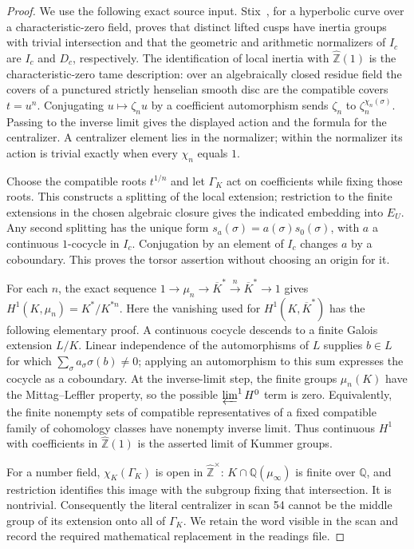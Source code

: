 \documentclass[11pt,a4paper]{article}
\newcommand{\Q}{\mathbb Q}
\newcommand{\Zhat}{\widehat{\mathbb Z}}
\begin{document}
\begin{proof}
We use the following exact source input. Stix~\cite[Proposition 11 and Corollary 12]{Stix2008}, for a hyperbolic curve over a characteristic-zero field, proves that distinct lifted cusps have inertia groups with trivial intersection and that the geometric and arithmetic normalizers of $I_c$ are $I_c$ and $D_c$, respectively. The identification of local inertia with $\Zhat(1)$ is the characteristic-zero tame description: over an algebraically closed residue field the covers of a punctured strictly henselian smooth disc are the compatible covers $t=u^n$. Conjugating $u\mapsto\zeta_nu$ by a coefficient automorphism sends $\zeta_n$ to $\zeta_n^{\chi_n(\sigma)}$. Passing to the inverse limit gives the displayed action and the formula for the centralizer. A centralizer element lies in the normalizer; within the normalizer its action is trivial exactly when every $\chi_n$ equals $1$.

Choose the compatible roots $t^{1/n}$ and let $\Gamma_K$ act on coefficients while fixing those roots. This constructs a splitting of the local extension; restriction to the finite extensions in the chosen algebraic closure gives the indicated embedding into $E_U$. Any second splitting has the unique form $s_a(\sigma)=a(\sigma)s_0(\sigma)$, with $a$ a continuous $1$-cocycle in $I_c$. Conjugation by an element of $I_c$ changes $a$ by a coboundary. This proves the torsor assertion without choosing an origin for it.

For each $n$, the exact sequence $1\to\mu_n\to\overline K^*\xrightarrow{n}\overline K^*\to1$ gives $H^1(K,\mu_n)=K^*/K^{*n}$. Here the vanishing used for $H^1(K,\overline K^*)$ has the following elementary proof. A continuous cocycle descends to a finite Galois extension $L/K$. Linear independence of the automorphisms of $L$ supplies $b\in L$ for which $\sum_\sigma a_\sigma\sigma(b)\ne0$; applying an automorphism to this sum expresses the cocycle as a coboundary. At the inverse-limit step, the finite groups $\mu_n(K)$ have the Mittag--Leffler property, so the possible $\varprojlim^1 H^0$ term is zero. Equivalently, the finite nonempty sets of compatible representatives of a fixed compatible family of cohomology classes have nonempty inverse limit. Thus continuous $H^1$ with coefficients in $\Zhat(1)$ is the asserted limit of Kummer groups.

For a number field, $\chi_K(\Gamma_K)$ is open in $\Zhat^\times$: $K\cap\Q(\mu_\infty)$ is finite over $\Q$, and restriction identifies this image with the subgroup fixing that intersection. It is nontrivial. Consequently the literal centralizer in scan 54 cannot be the middle group of its extension onto all of $\Gamma_K$. We retain the word visible in the scan and record the required mathematical replacement in the readings file.
\end{proof}
\end{document}
